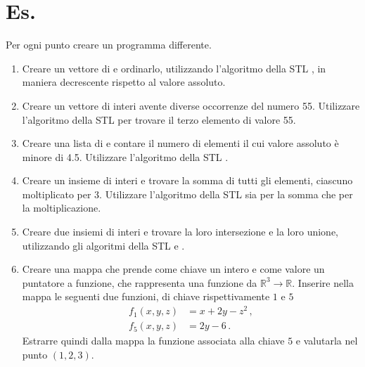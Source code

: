 \section*{Es.}
Per ogni punto creare un programma differente.
\begin{enumerate}
	\item Creare un vettore di  e ordinarlo, utilizzando l'algoritmo della STL , 
	in maniera decrescente rispetto al valore assoluto.
	\item Creare un vettore di interi avente diverse occorrenze del numero 55. Utilizzare l'algoritmo
	della STL  per trovare il terzo elemento di valore 55.
	\item Creare una lista di  e contare il numero di elementi il cui valore assoluto \`e minore
	di 4.5. Utilizzare l'algoritmo della STL .
	\item Creare un insieme di interi e trovare la somma di tutti gli elementi, ciascuno moltiplicato per 3.
	Utilizzare l'algoritmo della STL  sia per la somma che per la moltiplicazione.
	\item Creare due insiemi di interi e trovare la loro intersezione e la loro unione, utilizzando gli
	algoritmi della STL  e .
	\item Creare una mappa che prende come chiave un intero e come valore un puntatore a funzione, che 
	rappresenta una funzione da $\mathbb{R}^3 \rightarrow \mathbb{R}$. Inserire nella mappa 
	le seguenti due funzioni, di chiave rispettivamente $1$ e $5$
	\begin{align*}
		f_1(x,y,z) &= x+2y-z^2\,,\\
		f_5(x,y,z) &= 2y-6\,.
	\end{align*}
	Estrarre quindi dalla mappa la funzione associata alla chiave $5$ e valutarla nel punto $(1,2,3)$.
\end{enumerate}
